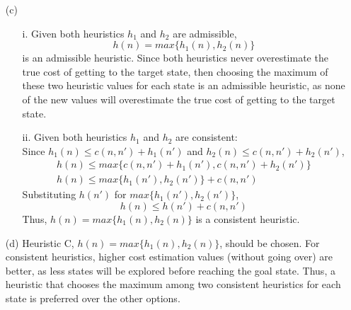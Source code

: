 \documentclass[11pt]{article}
\begin{document}
\begin{enumerate}
        \item[(c)]
            \begin{enumerate}
                \item[i.] Given both heuristics $h_1$ and $h_2$ are admissible,
                \[h(n) = max\{h_1(n), h_2(n)\}\] is an admissible heuristic.
                Since both heuristics never overestimate the true cost of getting to the target state, then choosing the maximum
                of these two heuristic values for each state is an admissible heuristic, as none of the
                new values will overestimate the true cost of getting to the target state.
                \item[ii.] Given both heuristics $h_1$ and $h_2$ are consistent: \\
                Since $h_1(n) \leq c(n, n') + h_1(n')$ and $h_2(n) \leq c(n, n') + h_2(n')$,
                \begin{gather*}
                    h(n) \leq max\{c(n, n') + h_1(n'), c(n, n') + h_2(n')\}\\
                    h(n) \leq max\{h_1(n'), h_2(n')\} + c(n, n')
                \end{gather*}
                Substituting $h(n')$ for $max\{h_1(n'), h_2(n')\}$,
                \[h(n) \leq h(n') + c(n, n')\]
                Thus, $h(n) = max\{h_1(n), h_2(n)\}$ is a consistent heuristic.
            \end{enumerate}
        \item[(d)] Heuristic C, $h(n) = max\{h_1(n), h_2(n)\}$, should be chosen.
        For consistent heuristics, higher cost estimation values (without going over) are better,
        as less states will be explored before reaching the goal state.
        Thus, a heuristic that chooses the maximum among two consistent heuristics for each state is preferred
        over the other options.
    \end{enumerate}
\end{document}
